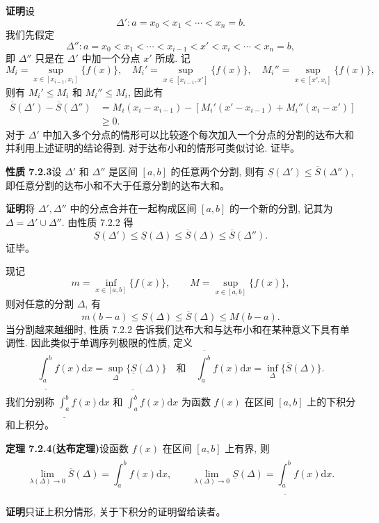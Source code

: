 \documentclass[UTF8, 12pt, fontset=fandol, oneside]{ctexart}
\begin{document}
\noindent\textbf{证明}\quad 设
\[
  \Delta':a=x_0<x_1<\cdots<x_n=b.
\]
我们先假定
\[
  \Delta'':a=x_0<x_1<\cdots<x_{i-1}<x'<x_i<\cdots<x_n=b,
\]
即 $\Delta''$ 只是在 $\Delta'$ 中加一个分点 $x'$ 所成. 记
\[
  M_i=\sup_{x\in[x_{i-1},x_i]}\{f(x)\},\quad
  M_i'=\sup_{x\in[x_{i-1},x']}\{f(x)\},\quad
  M_i''=\sup_{x\in[x',x_i]}\{f(x)\},
\]
则有 $M_i'\leq M_i$ 和 $M_i''\leq M_i$, 因此有
\[
\begin{aligned}
  \overline S(\Delta')-\overline S(\Delta'')
  &=M_i(x_i-x_{i-1})-[M_i'(x'-x_{i-1})+M_i''(x_i-x')]\\
  &\geq0.
\end{aligned}
\]
对于 $\Delta'$ 中加入多个分点的情形可以比较逐个每次加入一个分点的分割的达布大和并利用上述证明的结论得到. 对于达布小和的情形可类似讨论. 证毕。

\noindent\textbf{性质 7.2.3}\quad 设 $\Delta'$ 和 $\Delta''$ 是区间 $[a,b]$ 的任意两个分割, 则有 $\underline S(\Delta')\leq\overline S(\Delta'')$, 即任意分割的达布小和不大于任意分割的达布大和。

\noindent\textbf{证明}\quad 将 $\Delta',\Delta''$ 中的分点合并在一起构成区间 $[a,b]$ 的一个新的分割, 记其为 $\Delta=\Delta'\cup\Delta''$. 由性质 7.2.2 得
\[
  \underline S(\Delta')\leq \underline S(\Delta)\leq \overline S(\Delta)\leq \overline S(\Delta'').
\]
证毕。

现记
\[
  m=\inf_{x\in[a,b]}\{f(x)\},\qquad M=\sup_{x\in[a,b]}\{f(x)\},
\]
则对任意的分割 $\Delta$, 有
\[
  m(b-a)\leq \underline S(\Delta)\leq \overline S(\Delta)\leq M(b-a).
\]
当分割越来越细时, 性质 7.2.2 告诉我们达布大和与达布小和在某种意义下具有单调性. 因此类似于单调序列极限的性质, 定义
\[
  \underline{\int_a^b} f(x)\mathrm dx=\sup_\Delta\{\underline S(\Delta)\}
  \quad\text{和}\quad
  \overline{\int_a^b} f(x)\mathrm dx=\inf_\Delta\{\overline S(\Delta)\}.
\]
我们分别称 $\underline{\int_a^b} f(x)\mathrm dx$ 和 $\overline{\int_a^b} f(x)\mathrm dx$ 为函数 $f(x)$ 在区间 $[a,b]$ 上的下积分和上积分。

\noindent\textbf{定理 7.2.4(达布定理)}\quad 设函数 $f(x)$ 在区间 $[a,b]$ 上有界, 则
\[
  \lim_{\lambda(\Delta)\to0}\overline S(\Delta)=\overline{\int_a^b} f(x)\mathrm dx,\qquad
  \lim_{\lambda(\Delta)\to0}\underline S(\Delta)=\underline{\int_a^b} f(x)\mathrm dx.
\]

\noindent\textbf{证明}\quad 只证上积分情形, 关于下积分的证明留给读者。
\end{document}
